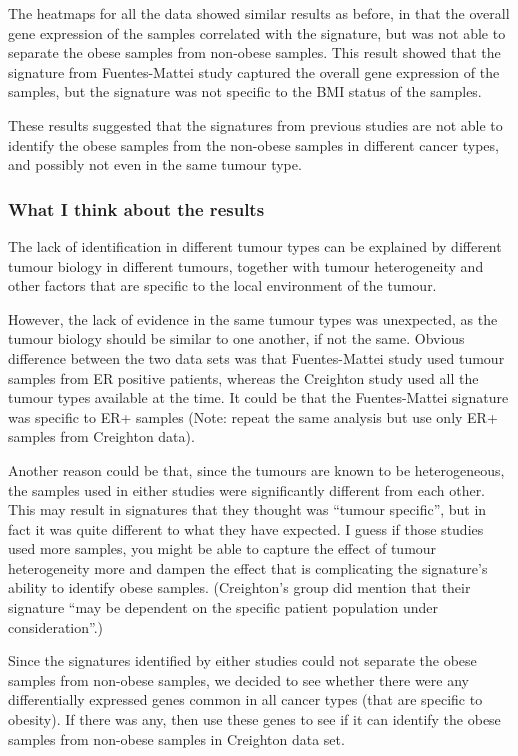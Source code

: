 \documentclass[a4paper, 11pt]{article}
\begin{document}
The heatmaps for all the data showed similar results as before, in that the overall gene expression of the samples correlated with the signature, but was not able to separate the obese samples from non-obese samples.
This result showed that the signature from Fuentes-Mattei study captured the overall gene expression of the samples, but the signature was not specific to the BMI status of the samples.

These results suggested that the signatures from previous studies are not able to identify the obese samples from the non-obese samples in different cancer types, and possibly not even in the same tumour type.

\subsubsection*{What I think about the results}

The lack of identification in different tumour types can be explained by different tumour biology in different tumours, together with tumour heterogeneity and other factors that are specific to the local environment of the tumour.

However, the lack of evidence in the same tumour types was unexpected, as the tumour biology should be similar to one another, if not the same.
Obvious difference between the two data sets was that Fuentes-Mattei study used tumour samples from ER positive patients, whereas the Creighton study used all the tumour types available at the time.
It could be that the Fuentes-Mattei signature was specific to ER+ samples (Note: repeat the same analysis but use only ER+ samples from Creighton data).

Another reason could be that, since the tumours are known to be heterogeneous, the samples used in either studies were significantly different from each other.
This may result in signatures that they thought was ``tumour specific'', but in fact it was quite different to what they have expected.
I guess if those studies used more samples, you might be able to capture the effect of tumour heterogeneity more and dampen the effect that is complicating the signature's ability to identify obese samples.
(Creighton's group did mention that their signature ``may be dependent on the specific patient population under consideration''.)\\
\newline

Since the signatures identified by either studies could not separate the obese samples from non-obese samples, we decided to see whether there were any differentially expressed genes common in all cancer types (that are specific to obesity).
If there was any, then use these genes to see if it can identify the obese samples from non-obese samples in Creighton data set.
\end{document}
